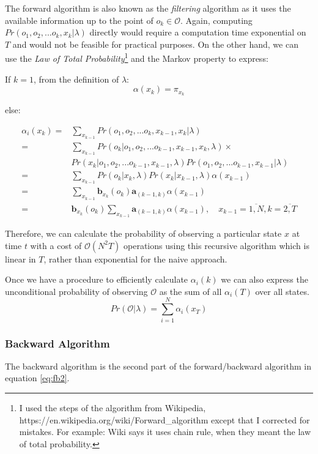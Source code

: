 \documentclass[a4paper,12pt]{article}
\theoremstyle{definition}
\begin{document}
The forward algorithm is also known as the \textit{filtering} algorithm as it uses the available information up to the point of $o_k \in \mathcal{O}$. Again, computing $Pr(o_1,o_2,...o_k,x_k | \lambda)$ directly would require a computation time exponential on $T$ and would not be feasible for practical purposes. 
On the other hand, we can use the \textit{Law of Total Probability}\footnote{I used the steps of the algorithm from Wikipedia, https://en.wikipedia.org/wiki/Forward\_algorithm except that I corrected for mistakes. For example: Wiki says it uses chain rule, when they meant the law of total probability.} and the Markov property to express:

If $k=1$, from the definition of $\lambda$: $$\alpha(x_k) = \pi_{x_k}$$

else:

\begin{align}
\alpha_i\left( x_k \right) =& \sum_{x_{k-1}} Pr(o_1,o_2,...o_k,x_{k-1},x_k | \lambda) \\
= &\sum_{x_{k-1}} Pr(o_k | o_1,o_2,...o_{k-1},x_{k-1},x_k, \lambda)\times \\&Pr(x_k|o_1,o_2,...o_{k-1},x_{k-1},\lambda) Pr(o_1,o_2,...o_{k-1},x_{k-1}|\lambda)
\\ =& \sum_{x_{k-1}} Pr(o_k | x_k, \lambda)Pr(x_k|x_{k-1},\lambda) \alpha\left( x_{k-1} \right)
\\ =& \sum_{x_{k-1}} \mathbf{b}_{x_k}(o_k)  \mathbf{a}_{(k-1,k)}\alpha\left( x_{k-1} \right) 
\\ =& \mathbf{b}_{x_k}(o_k) \sum_{x_{k-1}} \mathbf{a}_{(k-1,k)}\alpha\left( x_{k-1} \right) , \quad x_{k-1}=\overline{1,N}, k=\overline{2,T}
\end{align}

Therefore, we can calculate the probability of observing a particular state $x$ at time $t$ with a cost of $\mathcal{O}(N^2T)$ operations using this recursive algorithm which is linear in $T$, rather than exponential for the naive approach. 

Once we have a procedure to efficiently calculate $\alpha_i(k)$ we can also express the unconditional probability of observing $\mathcal{O}$ as the sum of all $\alpha_i(T)$ over all states.
\begin{equation}\label{eq:Pr(O)}
Pr(\mathcal{O}|\lambda) = \sum_{i=1}^N \alpha_i(x_T)
\end{equation}

\subsubsection{Backward Algorithm}\label{sec:ba}
The backward algorithm is the second part of the forward/backward algorithm in equation \ref{eq:fb2}.
\end{document}
